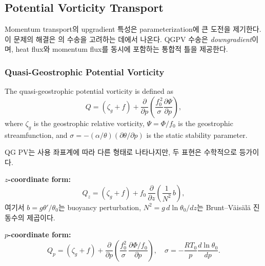 \subsection{Potential Vorticity Transport}

Momentum transport의 upgradient 특성은 parameterization에 큰 도전을 제기한다.
이 문제의 해결은 의 수송을
고려하는 데에서 나온다.  QGPV 수송은 \textit{downgradient}이며,
heat flux와 momentum flux를 동시에 포함하는 통합적 틀을 제공한다.

\subsubsection{Quasi-Geostrophic Potential Vorticity}

\begin{definition}
The quasi-geostrophic potential vorticity is defined as
\begin{equation}\label{eq:QGPV}
  Q = (\zeta_g + f) + \frac{\partial}{\partial p}
    \left(\frac{f_0^{\,2}}{\sigma}\frac{\partial\Psi}{\partial p}\right),
\end{equation}
where $\zeta_g$ is the geostrophic relative vorticity,
$\Psi = \Phi/f_0$ is the geostrophic streamfunction, and
$\sigma = -(\alpha/\theta)(\partial\theta/\partial p)$ is the static
stability parameter.
\end{definition}


\begin{theorem}\label{thm:ch04_hw6_qgpv_equiv}
QG PV는 사용 좌표계에 따라 다른 형태로 나타나지만, 두 표현은 수학적으로 등가이다.

\smallskip
\textbf{$z$-coordinate form:}
\begin{equation}\label{eq:Q_zcoord}
  Q_z = (\zeta_g + f) + f_0\,\frac{\partial}{\partial z}
    \left(\frac{1}{N^2}\,b\right),
\end{equation}
여기서 $b = g\theta'/\theta_0$는 buoyancy perturbation, $N^2 = g\,d\ln\theta_0/dz$는
Brunt--V\"ais\"al\"a 진동수의 제곱이다.

\smallskip
\textbf{$p$-coordinate form:}
\begin{equation}\label{eq:Q_pcoord}
  Q_p = (\zeta_g + f) + \frac{\partial}{\partial p}
    \left(\frac{f_0^2}{\sigma}\,\frac{\partial\Phi/f_0}{\partial p}\right),
  \quad
  \sigma = -\frac{RT_0}{p}\frac{d\ln\theta_0}{dp}.
\end{equation}
\end{theorem}

